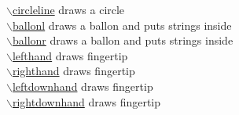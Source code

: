 \documentclass[papersize,a4paper,12pt]{article}
\newcommand{\bs}{$\backslash$}
\begin{document}
\begin{tabbing}
\hyperlink{circleline}{\bs circleline} \> draws a circle\\
\hyperlink{ballonl}{\bs ballonl} \> draws a ballon and puts strings inside\\
\hyperlink{ballonr}{\bs ballonr} \> draws a ballon and puts strings inside\\
\hyperlink{lefthand}{\bs lefthand} \> draws fingertip\\
\hyperlink{righthand}{\bs righthand} \> draws fingertip\\
\hyperlink{leftdownhand}{\bs leftdownhand} \> draws fingertip\\
\hyperlink{rightdownhand}{\bs rightdownhand} \> draws fingertip\\

\end{tabbing}
\end{document}
